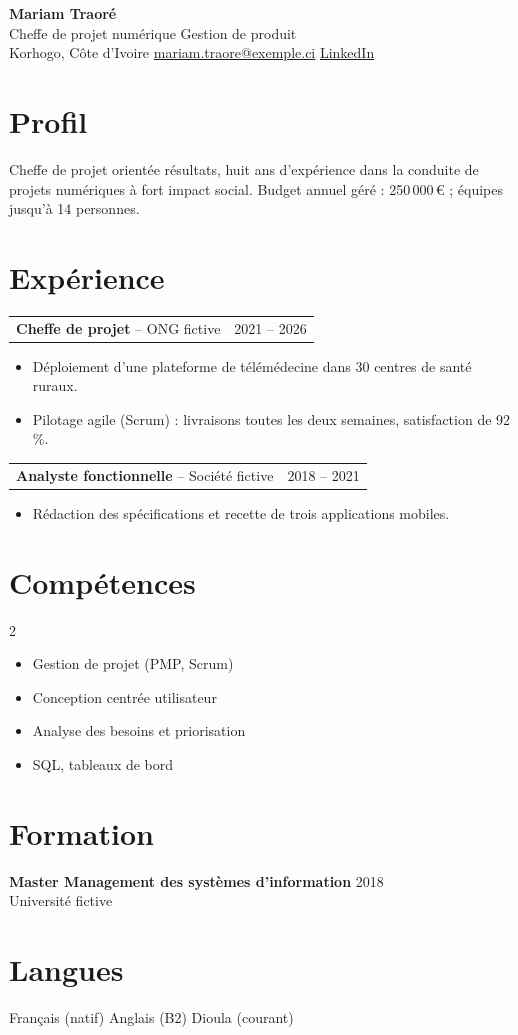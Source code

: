 \documentclass[11pt,a4paper]{article}
\begin{document}
\begin{center}
  {\huge\bfseries Mariam Traoré}\\[4pt]
  Cheffe de projet numérique \textbar{} Gestion de produit\\[2pt]
  \small Korhogo, Côte d'Ivoire \textbullet{} \href{mailto:mariam.traore@exemple.ci}{mariam.traore@exemple.ci}
  \textbullet{} \href{https://www.linkedin.com/in/exemple}{LinkedIn}
\end{center}

\section{Profil}
Cheffe de projet orientée résultats, huit ans d'expérience dans la conduite de projets numériques
à fort impact social. Budget annuel géré : 250\,000\,€ ; équipes jusqu'à 14 personnes.

\section{Expérience}
\begin{tabularx}{\textwidth}{@{}X r@{}}
\textbf{Cheffe de projet} -- ONG fictive & 2021 -- 2026 \\
\end{tabularx}
\begin{itemize}
  \item Déploiement d'une plateforme de télémédecine dans 30 centres de santé ruraux.
  \item Pilotage agile (Scrum) : livraisons toutes les deux semaines, satisfaction de 92\,\%.
\end{itemize}
\begin{tabularx}{\textwidth}{@{}X r@{}}
\textbf{Analyste fonctionnelle} -- Société fictive & 2018 -- 2021 \\
\end{tabularx}
\begin{itemize}
  \item Rédaction des spécifications et recette de trois applications mobiles.
\end{itemize}

\section{Compétences}
\begin{multicols}{2}
\begin{itemize}
  \item Gestion de projet (PMP, Scrum)
  \item Conception centrée utilisateur
  \item Analyse des besoins et priorisation
  \item SQL, tableaux de bord
\end{itemize}
\end{multicols}

\section{Formation}
\textbf{Master Management des systèmes d'information} \hfill 2018\\
Université fictive

\section{Langues}
Français (natif) \textbullet{} Anglais (B2) \textbullet{} Dioula (courant)
\end{document}
